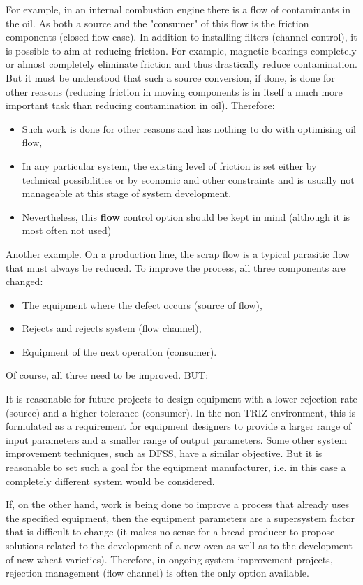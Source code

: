 \documentclass[a4paper,11pt]{article}
\begin{document}
For example, in an internal combustion engine there is a flow of contaminants
in the oil. As both a source and the "consumer" of this flow is the friction
components (closed flow case). In addition to installing filters (channel
control), it is possible to aim at reducing friction. For example, magnetic
bearings completely or almost completely eliminate friction and thus
drastically reduce contamination. But it must be understood that such a source
conversion, if done, is done for other reasons (reducing friction in moving
components is in itself a much more important task than reducing contamination
in oil). Therefore:
\begin{itemize}
\item Such work is done for other reasons and has nothing to do with
  optimising oil flow,
\item In any particular system, the existing level of friction is set either
  by technical possibilities or by economic and other constraints and is
  usually not manageable at this stage of system development.
\item Nevertheless, this \textbf{flow} control option should be kept in mind
  (although it is most often not used)
\end{itemize}
Another example. On a production line, the scrap flow is a typical parasitic
flow that must always be reduced. To improve the process, all three components
are changed:
\begin{itemize}
\item The equipment where the defect occurs (source of flow),
\item Rejects and rejects system (flow channel),
\item Equipment of the next operation (consumer).
\end{itemize}
Of course, all three need to be improved. BUT:

It is reasonable for future projects to design equipment with a lower
rejection rate (source) and a higher tolerance (consumer). In the non-TRIZ
environment, this is formulated as a requirement for equipment designers to
provide a larger range of input parameters and a smaller range of output
parameters. Some other system improvement techniques, such as DFSS, have a
similar objective. But it is reasonable to set such a goal for the equipment
manufacturer, i.e. in this case a completely different system would be
considered.

If, on the other hand, work is being done to improve a process that already
uses the specified equipment, then the equipment parameters are a supersystem
factor that is difficult to change (it makes no sense for a bread producer to
propose solutions related to the development of a new oven as well as to the
development of new wheat varieties). Therefore, in ongoing system improvement
projects, rejection management (flow channel) is often the only option
available.
\end{document}
